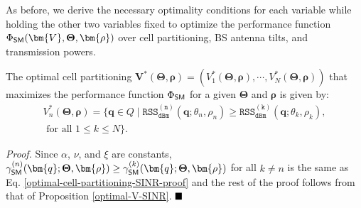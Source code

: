 As before, we derive the necessary optimality conditions for each variable while holding the other two variables fixed to optimize the performance function $\Phi_{{\sf SM}}(\bm{V}, \mathbf{\Theta}, \bm{\rho})$ over cell partitioning, BS antenna tilts, and transmission powers.
\begin{Proposition}\label{optimal-cell-partitioning-SM-performance}
    The optimal cell partitioning $\bm{V}^*(\bm{\Theta}, \bm{\rho}) = \left(V_1^*(\bm{\Theta}, \bm{\rho}), \cdots, V_N^*(\bm{\Theta}, \bm{\rho}) \right)$ that maximizes the performance function $\Phi_{{\sf SM}}$ for a given $\bm{\Theta}$ and $\bm{\rho}$ is given by:
\begin{multline}\label{optimal-cell-partitioning-SM}
   \!\!\!\!\! V_n^*(\bm{\Theta}, \bm{\rho}) = \big\{\bm{q} \in Q \mid \mathtt{RSS_{dBm}^{(n)}}(\bm{q}; \theta_n, \rho_n) \geq \mathtt{RSS_{dBm}^{(k)}}(\bm{q}; \theta_k, \rho_k), \\ \textrm{ for all } 1 \leq k \leq N \big\}.
\end{multline}    
\end{Proposition}
\textit{Proof. }
Since $\alpha$, $\nu$, and $\xi$ are constants, $\gamma_{\sf SM}^{(n)}(\bm{q}; \mathbf{\Theta}, \bm{\rho}) \geq \gamma_{\sf SM}^{(k)}(\bm{q}; \mathbf{\Theta}, \bm{\rho})$ for all $k \neq n$ is the same as Eq. \eqref{optimal-cell-partitioning-SINR-proof} and the rest of the proof follows from that of Proposition \ref{optimal-V-SINR}. $\hfill\blacksquare$ 



